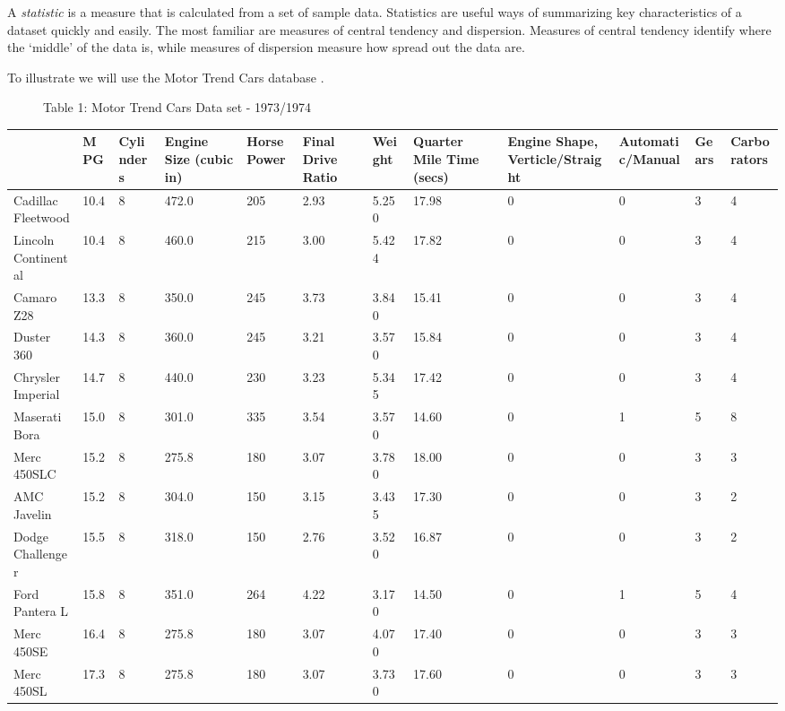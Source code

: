 \documentclass[]{book}
\theoremstyle{definition}
\theoremstyle{definition}
\theoremstyle{remark}
\begin{document}
A \emph{statistic} is a measure that is calculated from a set of sample
data. Statistics are useful ways of summarizing key characteristics of a
dataset quickly and easily. The most familiar are measures of central
tendency and dispersion. Measures of central tendency identify where the
`middle' of the data is, while measures of dispersion measure how spread
out the data are.

\begin{description}
\item[To illustrate we will use the Motor Trend Cars database
\citep{hocking1976biometrics}.]
Table 1: Motor Trend Cars Data set - 1973/1974
\end{description}

\begin{tabular}{l|l|l|l|l|l|l|l|l|l|l|l}
\hline
  & MPG & Cylinders & Engine Size (cubic in) & Horse Power & Final Drive Ratio & Weight & Quarter Mile Time (secs) & Engine Shape, Verticle/Straight & Automatic/Manual & Gears & Carborators\\
\hline
Cadillac Fleetwood & 10.4 & 8 & 472.0 & 205 & 2.93 & 5.250 & 17.98 & 0 & 0 & 3 & 4\\
\hline
Lincoln Continental & 10.4 & 8 & 460.0 & 215 & 3.00 & 5.424 & 17.82 & 0 & 0 & 3 & 4\\
\hline
Camaro Z28 & 13.3 & 8 & 350.0 & 245 & 3.73 & 3.840 & 15.41 & 0 & 0 & 3 & 4\\
\hline
Duster 360 & 14.3 & 8 & 360.0 & 245 & 3.21 & 3.570 & 15.84 & 0 & 0 & 3 & 4\\
\hline
Chrysler Imperial & 14.7 & 8 & 440.0 & 230 & 3.23 & 5.345 & 17.42 & 0 & 0 & 3 & 4\\
\hline
Maserati Bora & 15.0 & 8 & 301.0 & 335 & 3.54 & 3.570 & 14.60 & 0 & 1 & 5 & 8\\
\hline
Merc 450SLC & 15.2 & 8 & 275.8 & 180 & 3.07 & 3.780 & 18.00 & 0 & 0 & 3 & 3\\
\hline
AMC Javelin & 15.2 & 8 & 304.0 & 150 & 3.15 & 3.435 & 17.30 & 0 & 0 & 3 & 2\\
\hline
Dodge Challenger & 15.5 & 8 & 318.0 & 150 & 2.76 & 3.520 & 16.87 & 0 & 0 & 3 & 2\\
\hline
Ford Pantera L & 15.8 & 8 & 351.0 & 264 & 4.22 & 3.170 & 14.50 & 0 & 1 & 5 & 4\\
\hline
Merc 450SE & 16.4 & 8 & 275.8 & 180 & 3.07 & 4.070 & 17.40 & 0 & 0 & 3 & 3\\
\hline
Merc 450SL & 17.3 & 8 & 275.8 & 180 & 3.07 & 3.730 & 17.60 & 0 & 0 & 3 & 3\\

\end{tabular}
\end{document}
